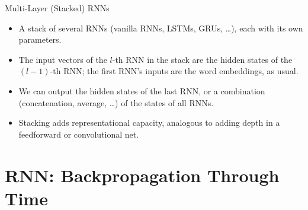 \begin{vbframe}{Multi-Layer (Stacked) RNNs}
  \begin{itemize}
    \item A stack of several RNNs (vanilla RNNs, LSTMs, GRUs, \ldots), each with its own parameters.
    \item The input vectors of the $l$-th RNN in the stack are the hidden states of the $(l-1)$-th RNN; the first RNN's inputs are the word embeddings, as usual.
    \item We can output the hidden states of the last RNN, or a combination (concatenation, average, \ldots) of the states of all RNNs.
    \item Stacking adds representational capacity, analogous to adding depth in a feedforward or convolutional net.
  \end{itemize}
  \begin{center}
  \end{center}
\end{vbframe}

\section{RNN: Backpropagation Through Time}

